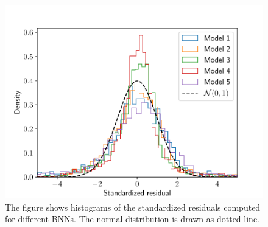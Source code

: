 \begin{figure}
    \centering
    \includegraphics[scale=1]{figures/standardized_residuals/standardized_residual_simple_models.pdf}
    \caption{The figure shows histograms of the standardized residuals computed for 
        different BNNs. The normal distribution is drawn as dotted line. 
    }
    \label{fig:standardized_residual}
\end{figure}
